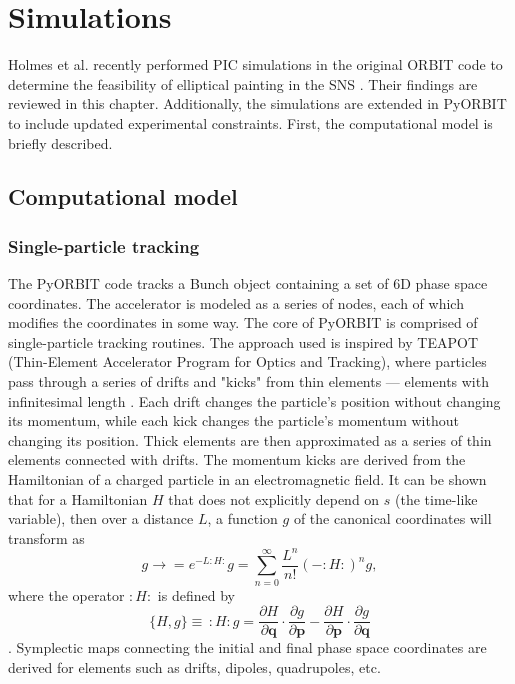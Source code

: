 \chapter{Simulations} \label{chap-3}

Holmes et al. recently performed PIC simulations in the original ORBIT code to determine the feasibility of elliptical painting in the SNS \cite{Holmes2018}. Their findings are reviewed in this chapter. Additionally, the simulations are extended in PyORBIT to include updated experimental constraints. First, the computational model is briefly described. 


\section{Computational model}


\subsection{Single-particle tracking}

The PyORBIT code tracks a Bunch object containing a set of 6D phase space coordinates. The accelerator is modeled as a series of nodes, each of which modifies the coordinates in some way. The core of PyORBIT is comprised of single-particle tracking routines. The approach used is inspired by TEAPOT (Thin-Element Accelerator Program for Optics and Tracking), where particles pass through a series of drifts and "kicks" from thin elements — elements with infinitesimal length \cite{Schachinger1987}. Each drift changes the particle's position without changing its momentum, while each kick changes the particle's momentum without changing its position. Thick elements are then approximated as a series of thin elements connected with drifts. The momentum kicks are derived from the Hamiltonian of a charged particle in an electromagnetic field. It can be shown that for a Hamiltonian $H$ that does not explicitly depend on $s$ (the time-like variable), then over a distance $L$, a function $g$ of the canonical coordinates will transform as
%
\begin{equation}
    g \rightarrow 
    = e^{-L:H:} g
    = \sum_{n=0}^{\infty}{\frac{L^n}{n!} (-:H:)^n g},
\end{equation}
%
where the operator $:H:$ is defined by
%
\begin{equation}
    \{H, g\} \equiv \, :H: g =
    \frac{\partial{H}}{\partial{\mathbf{q}}}
    \cdot
    \frac{\partial{g}}{\partial{\mathbf{p}}}
    -
    \frac{\partial{H}}{\partial{\mathbf{p}}}
    \cdot
    \frac{\partial{g}}{\partial{\mathbf{q}}}
\end{equation}
%
\cite{Dragt2018, Forest1998}. Symplectic maps connecting the initial and final phase space coordinates are derived for elements such as drifts, dipoles, quadrupoles, etc.

